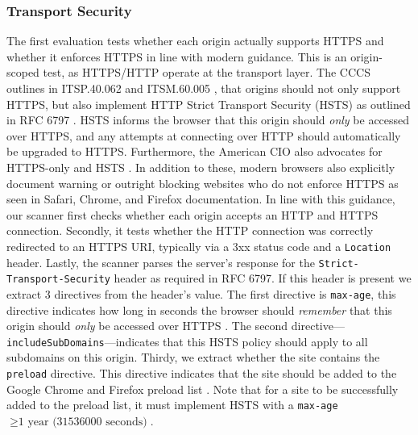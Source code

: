 \documentclass[pdflatex,sn-mathphys-num]{sn-jnl}
\numberwithin{equation}{section}
\theoremstyle{thmstyleone}
\theoremstyle{thmstyletwo}%
\theoremstyle{thmstylethree}%
\begin{document}
\subsubsection{Transport Security}

The first evaluation tests whether each origin actually supports HTTPS and whether it enforces HTTPS 
in line with modern guidance. This is an origin-scoped test, as HTTPS/HTTP operate at the transport layer. 
The CCCS outlines in
ITSP.40.062 \cite{cccs-itsp-40062} and ITSM.60.005 \cite{cccs-itsm-60005}, that origins should not only support HTTPS, but also implement HTTP Strict Transport 
Security (HSTS) as outlined in RFC 6797 \cite{rfc6797}. HSTS informs the browser that this origin should \emph{only} be accessed over HTTPS, and any attempts at connecting over HTTP
should automatically be upgraded to HTTPS. Furthermore, the American CIO also advocates for HTTPS-only and HSTS \cite{uscio-https-guide, uscio-hsts}. 
In addition to these, modern browsers also explicitly document warning or outright blocking websites who do not enforce HTTPS as seen in Safari, Chrome, 
and Firefox \cite{apple-http-warning,chrome-always-https,firefox-https-only-mode} documentation. In line with this guidance, our scanner first checks whether each origin accepts an HTTP and HTTPS connection. Secondly, it tests whether the HTTP connection was correctly redirected to
an HTTPS URI, typically via a 3xx status code and a \texttt{Location} header. Lastly, the scanner parses the server's response for the \texttt{Strict-Transport-Security} header as required 
in RFC 6797. If this header is present we extract 3 directives from the header's value. The first directive is \texttt{max-age}, this directive indicates how long in seconds the browser should \emph{remember} that this origin
should \emph{only} be accessed over HTTPS \cite{mdn_sts_header}. The second directive---\texttt{includeSubDomains}---indicates that this HSTS policy should apply to all subdomains on this origin.
Thirdy, we extract whether the site contains the \texttt{preload} directive. This directive indicates that the site should be added to the Google 
Chrome and Firefox preload list \cite{chromium_hsts_preload,firefox_hsts_preload}. Note that for a site to be successfully added to the preload list, 
it must implement HSTS with a \texttt{max-age} $\geq \text{1 year (31536000 seconds)}$.   

\end{document}
